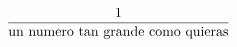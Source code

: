 \documentclass[preview]{standalone}
\begin{document}
\begin{align*}
\frac{1}{\mathrm{un\ numero\ tan\ grande\ \hfill como\ quieras}}
\end{align*}
\end{document}

